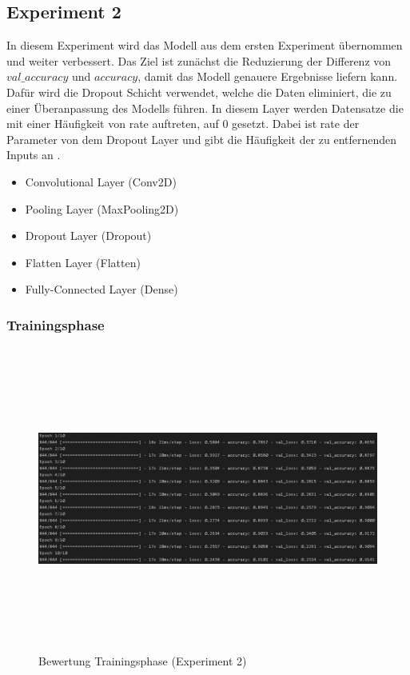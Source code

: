 \documentclass[12pt]{scrreprt}
\begin{document}
\subsection{Experiment 2}\label{model:ep2}
	
In diesem Experiment wird das Modell aus dem ersten Experiment übernommen und weiter verbessert. Das Ziel ist zunächst die Reduzierung der Differenz von $val\_accuracy$ und $accuracy$, damit das Modell genauere Ergebnisse liefern kann. Dafür wird die Dropout Schicht verwendet, welche die Daten eliminiert, die zu einer Überanpassung des Modells führen. In diesem Layer werden Datensatze die mit einer Häufigkeit von rate auftreten, auf 0 gesetzt. Dabei ist rate der Parameter von dem Dropout Layer und gibt die Häufigkeit der zu entfernenden Inputs an \cite{tensorflow2022}.\\

\begin{itemize}
	\item Convolutional Layer (Conv2D)
	\item Pooling Layer (MaxPooling2D)
	\item Dropout Layer (Dropout)
	\item Flatten Layer (Flatten)
	\item Fully-Connected Layer (Dense)
	\label{tab:model2}
\end{itemize}

\subsubsection{Trainingsphase}

\begin{figure}[h!]
	\centering
	\includegraphics[width=13.5cm, height=10cm]		{ExperimentModelTrainingsphase_2.png}
	\caption{ Bewertung Trainingsphase \cite{HK22}(Experiment 2)}
	\label{fig:fig16}
\end{figure}
\end{document}
